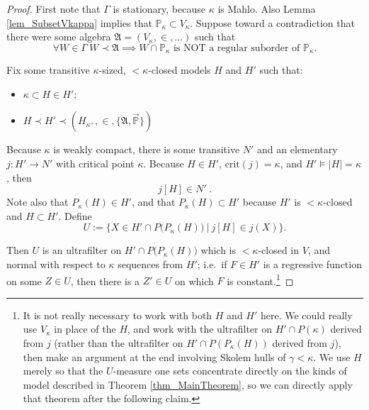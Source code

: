 \documentclass{amsart}
\begin{document}
\begin{proof}
First note that $\Gamma$ is stationary, because $\kappa$ is Mahlo.  Also Lemma \ref{lem_SubsetVkappa} implies that $\mathbb{P}_\kappa \subset V_\kappa$.  Suppose toward a contradiction that there were some algebra $\mathfrak{A} = (V_\kappa, \in, \dots)$ such that 
\begin{equation}
\forall W \in \Gamma \ W \prec \mathfrak{A} \implies W \cap \mathbb{P}_\kappa \text{ is NOT a regular suborder of } \mathbb{P}_\kappa.
\end{equation}    

Fix some transitive $\kappa$-sized, $<\kappa$-closed models $H$ and $H'$ such that:
\begin{itemize}
 \item $\kappa \subset H \in H'$;
 \item $H \prec H' \prec (H_{\kappa^+}, \in, \{ \mathfrak{A}, \vec{\mathbb{P}} \})$
\end{itemize}


Because $\kappa$ is weakly compact, there is some transitive $N'$ and an elementary $j: H' \to N'$ with critical point $\kappa$.  Because $H \in H'$, $\text{crit}(j) = \kappa$, and $H' \models |H|=\kappa$, then
\begin{equation}
j[H] \in N' \ .
\end{equation}
Note also that $P_\kappa(H) \in H'$, and that $P_\kappa(H) \subset H'$ because $H'$ is $<\kappa$-closed and $H \subset H'$.   Define
\begin{equation}
U:= \{ X \in H' \cap P\big(P_\kappa(H)\big) \ | \  j[H] \in j(X)   \}.
\end{equation}

Then $U$ is an ultrafilter on $H' \cap P\big(P_\kappa(H)\big)$ which is $<\kappa$-closed in $V$, and normal with respect to $\kappa$ sequences from $H'$; i.e.\ if $F \in H'$ is a regressive function on some $Z \in U$, then there is a $Z' \in U$ on which $F$ is constant.\footnote{It is not really necessary to work with both $H$ and $H'$ here.  We could really use $V_\kappa$ in place of the $H$, and work with the ultrafilter on $H' \cap P(\kappa)$ derived from $j$ (rather than the ultrafilter on $H' \cap P(P_\kappa(H))$ derived from $j$), then make an argument at the end involving Skolem hulls of $\gamma < \kappa$.  We use $H$ merely so that the $U$-measure one sets concentrate directly on the kinds of model described in Theorem \ref{thm_MainTheorem}, so we can directly apply that theorem after the following claim.}



\end{proof}
\end{document}
